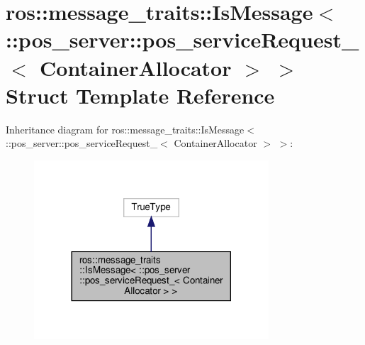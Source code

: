 \hypertarget{structros_1_1message__traits_1_1IsMessage_3_01_1_1pos__server_1_1pos__serviceRequest___3_01ContainerAllocator_01_4_01_4}{}\section{ros\+:\+:message\+\_\+traits\+:\+:Is\+Message$<$ \+:\+:pos\+\_\+server\+:\+:pos\+\_\+service\+Request\+\_\+$<$ Container\+Allocator $>$ $>$ Struct Template Reference}
\label{structros_1_1message__traits_1_1IsMessage_3_01_1_1pos__server_1_1pos__serviceRequest___3_01ContainerAllocator_01_4_01_4}


Inheritance diagram for ros\+:\+:message\+\_\+traits\+:\+:Is\+Message$<$ \+:\+:pos\+\_\+server\+:\+:pos\+\_\+service\+Request\+\_\+$<$ Container\+Allocator $>$ $>$\+:
\nopagebreak
\begin{figure}[H]
\begin{center}
\leavevmode
\includegraphics[width=248pt]{structros_1_1message__traits_1_1IsMessage_3_01_1_1pos__server_1_1pos__serviceRequest___3_01Conta2c475e4dfea947b5ce20fcccf41ee23f}
\end{center}
\end{figure}


